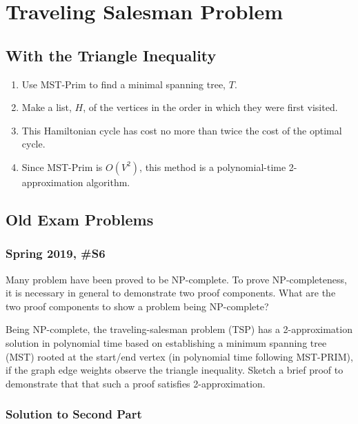 
\section{Traveling Salesman Problem}

\subsection{With the Triangle Inequality}

\begin{enumerate}
	\item Use MST-Prim to find a minimal spanning tree, $T$.  
	\item Make a list, $H$, of the vertices in the order in which they were first visited.
	\item This Hamiltonian cycle has cost no more than twice the cost of the optimal cycle.
	\item Since MST-Prim is $O(V^2)$, this method is a polynomial-time 2-approximation algorithm. 
\end{enumerate}

\subsection{Old Exam Problems}

\subsubsection{Spring 2019, \#S6}

Many problem have been proved to be NP-complete.  To prove NP-completeness, it is necessary in general to demonstrate two proof components.  What are the two proof components to show a problem being NP-complete?
	
	Being NP-complete, the traveling-salesman problem (TSP) has a 2-approximation solution in polynomial time based on establishing a minimum spanning tree (MST) rooted at the start/end vertex (in polynomial time following MST-PRIM), if the graph edge weights observe the triangle inequality.  Sketch a brief proof to demonstrate that that such a proof satisfies 2-approximation.  

\subsubsection{Solution to Second Part}

